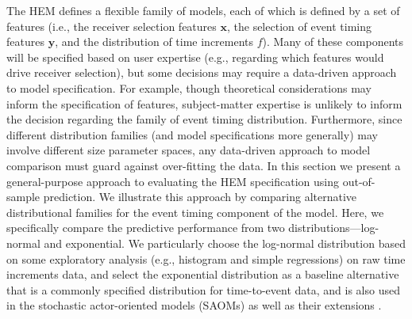 \documentclass[ba]{imsart}
\numberwithin{equation}{section}
\theoremstyle{plain}
\begin{document}
	The HEM defines a flexible family of models, each of which is defined by a set of features (i.e., the receiver selection features $\boldsymbol{x}$, the selection of event timing features $\boldsymbol{y}$, and the distribution of time increments $f$). Many of these components will be specified based on user expertise (e.g., regarding which features would drive receiver selection), but some decisions may require a data-driven approach to model specification. For example, though theoretical considerations may inform the specification of features, subject-matter expertise is unlikely to inform the decision regarding the family of event timing distribution. Furthermore, since different distribution families (and model specifications more generally) may involve different size parameter spaces, any data-driven approach to model comparison must guard against over-fitting the data. In this section we present a general-purpose approach to evaluating the HEM specification using out-of-sample prediction. We illustrate this approach by comparing alternative distributional families for the event timing component of the model. Here, we specifically compare the predictive performance from two distributions---log-normal and exponential. We particularly choose the log-normal distribution based on some exploratory analysis (e.g., histogram and simple regressions) on raw time increments data, and select the exponential distribution as a baseline alternative that is a commonly specified distribution for time-to-event data, and is also used in the stochastic actor-oriented models (SAOMs) \citep{snijders1996stochastic} as well as their extensions \citep{snijders2007modeling}. 
\end{document}

